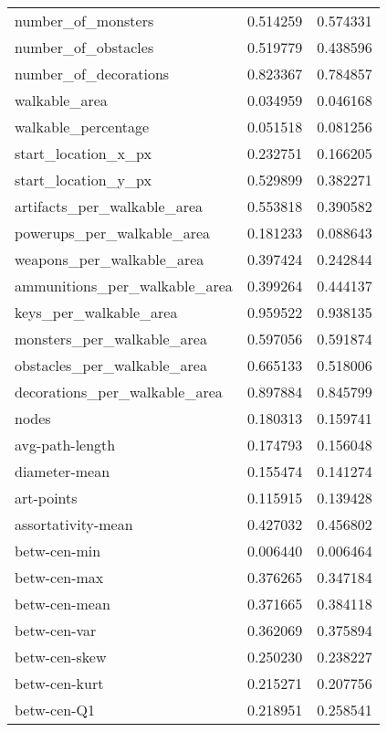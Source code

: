 \begin{longtable}{lrr}
	number\_of\_monsters            &  0.514259 &  0.574331 \\
	number\_of\_obstacles           &  0.519779 &  0.438596 \\
	number\_of\_decorations         &  0.823367 &  0.784857 \\
	walkable\_area                 &  0.034959 &  0.046168 \\
	walkable\_percentage           &  0.051518 &  0.081256 \\
	start\_location\_x\_px           &  0.232751 &  0.166205 \\
	start\_location\_y\_px           &  0.529899 &  0.382271 \\
	artifacts\_per\_walkable\_area   &  0.553818 &  0.390582 \\
	powerups\_per\_walkable\_area    &  0.181233 &  0.088643 \\
	weapons\_per\_walkable\_area     &  0.397424 &  0.242844 \\
	ammunitions\_per\_walkable\_area &  0.399264 &  0.444137 \\
	keys\_per\_walkable\_area        &  0.959522 &  0.938135 \\
	monsters\_per\_walkable\_area    &  0.597056 &  0.591874 \\
	obstacles\_per\_walkable\_area   &  0.665133 &  0.518006 \\
	decorations\_per\_walkable\_area &  0.897884 &  0.845799 \\
	nodes                         &  0.180313 &  0.159741 \\
	avg-path-length               &  0.174793 &  0.156048 \\
	diameter-mean                 &  0.155474 &  0.141274 \\
	art-points                    &  0.115915 &  0.139428 \\
	assortativity-mean            &  0.427032 &  0.456802 \\
	betw-cen-min                  &  0.006440 &  0.006464 \\
	betw-cen-max                  &  0.376265 &  0.347184 \\
	betw-cen-mean                 &  0.371665 &  0.384118 \\
	betw-cen-var                  &  0.362069 &  0.375894 \\
	betw-cen-skew                 &  0.250230 &  0.238227 \\
	betw-cen-kurt                 &  0.215271 &  0.207756 \\
	betw-cen-Q1                   &  0.218951 &  0.258541 \\

\end{longtable}
